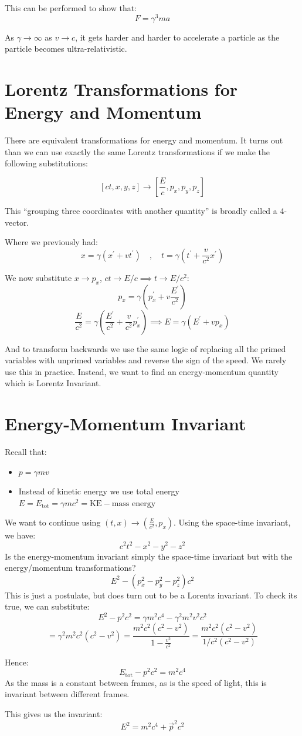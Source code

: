 This can be performed to show that:
\[
    F = \gamma^3 ma
\]

As $\gamma \to \infty$ as $v \to c$, it gets harder and harder to accelerate a particle as the particle becomes ultra-relativistic.

\section{Lorentz Transformations for Energy and Momentum}
There are equivalent transformations for energy and momentum. It turns out than we can use exactly the same Lorentz transformations if we make the following substitutions:

\[
    \left[ct, x, y, z\right] \to \left[\frac{E}{c}, p_x, p_y, p_z\right]
\]

This ``grouping three coordinates with another quantity'' is broadly called a 4-vector.

Where we previously had:
\[
    x = \gamma \left(x^\prime + vt^\prime\right) \quad , \quad t = \gamma \left(t^\prime + \frac{v}{c^2}x^\prime\right)
\]

We now substitute $x \to p_x$, $ct \to E/c \implies t \to E/c^2$:
\[
    p_x = \gamma \left(p_x^\prime + v \frac{E^\prime}{c^2}\right)
\]
\[
    \frac{E}{c^2} = \gamma \left(\frac{E^\prime}{c^2} + \frac{v}{c^2} p_x^\prime\right) \implies E = \gamma \left(E^\prime + v p_x\right)
\]

And to transform backwards we use the same logic of replacing all the primed variables with unprimed variables and reverse the sign of the speed. We rarely use this in practice. Instead, we want to find an energy-momentum quantity which is Lorentz Invariant.

\section{Energy-Momentum Invariant}
Recall that:
\begin{itemize}
    \item $p = \gamma mv$
    \item Instead of kinetic energy we use total energy $E = E_\text{tot} = \gamma mc^2 = \text{KE} - \text{mass energy}$
\end{itemize}

We want to continue using $(t, x) \to \left(\frac{E}{c^2}, p_x\right)$. Using the space-time invariant, we have:
\[
    c^2 t^2 - x^2 - y^2 - z^2
\]
Is the energy-momentum invariant simply the space-time invariant but with the energy/momentum transformations?
\[
    E^2 - (p_x^2 - p_y^2 - p_z^2)c^2
\]
This is just a postulate, but does turn out to be a Lorentz invariant. To check its true, we can substitute:
\[
    E^2 - p^2 c^2 = \gamma m^2 c^4 - \gamma^2 m^2 v^2 c^2
\]
\[
    = \gamma^2 m^2 c^2 \left(c^2 - v^2\right) = \frac{m^2 c^2 \left(c^2 - v^2\right)}{1 - \frac{v^2}{c^2}} = \frac{m^2 c^2 \left(c^2 - v^2\right)}{1/c^2 (c^2 - v^2)}
\]

Hence:
\[
    E_\text{tot} - p^2 c^2 = m^2 c^4
\]
As the mass is a constant between frames, as is the speed of light, this is invariant between different frames.

This gives us the invariant:
\[
    \boxed{E^2 = m^2 c^4 + \vec{p}^2 c^2}
\]
